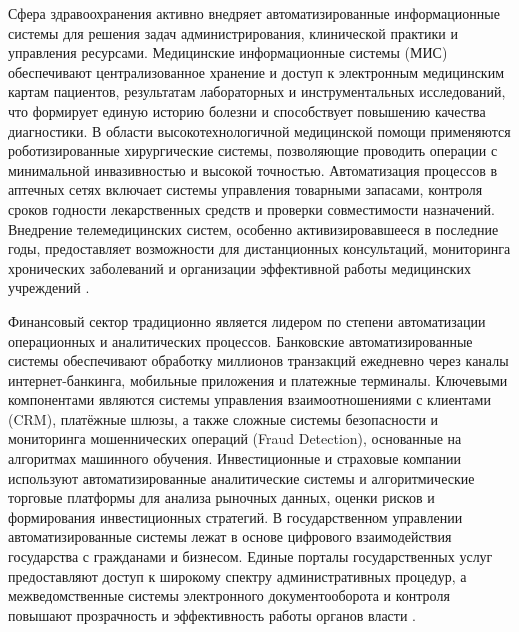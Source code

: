 \documentclass{SibFU-docs}
\begin{document}

Сфера здравоохранения активно внедряет автоматизированные информационные системы для решения задач администрирования, клинической практики и управления ресурсами. Медицинские информационные системы (МИС) обеспечивают централизованное хранение и доступ к электронным медицинским картам пациентов, результатам лабораторных и инструментальных исследований, что формирует единую историю болезни и способствует повышению качества диагностики. В области высокотехнологичной медицинской помощи применяются роботизированные хирургические системы, позволяющие проводить операции с минимальной инвазивностью и высокой точностью. Автоматизация процессов в аптечных сетях включает системы управления товарными запасами, контроля сроков годности лекарственных средств и проверки совместимости назначений. Внедрение телемедицинских систем, особенно активизировавшееся в последние годы, предоставляет возможности для дистанционных консультаций, мониторинга хронических заболеваний и организации эффективной работы медицинских учреждений \cite{minzdrav2023}.


Финансовый сектор традиционно является лидером по степени автоматизации операционных и аналитических процессов. Банковские автоматизированные системы обеспечивают обработку миллионов транзакций ежедневно через каналы интернет-банкинга, мобильные приложения и платежные терминалы. Ключевыми компонентами являются системы управления взаимоотношениями с клиентами (CRM), платёжные шлюзы, а также сложные системы безопасности и мониторинга мошеннических операций (Fraud Detection), основанные на алгоритмах машинного обучения. Инвестиционные и страховые компании используют автоматизированные аналитические системы и алгоритмические торговые платформы для анализа рыночных данных, оценки рисков и формирования инвестиционных стратегий. В государственном управлении автоматизированные системы лежат в основе цифрового взаимодействия государства с гражданами и бизнесом. Единые порталы государственных услуг предоставляют доступ к широкому спектру административных процедур, а межведомственные системы электронного документооборота и контроля повышают прозрачность и эффективность работы органов власти \cite{hse2023}.

\end{document}
